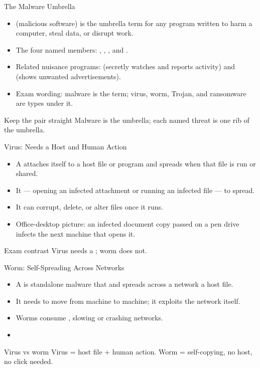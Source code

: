 \documentclass[aspectratio=169]{beamer}
\begin{document}
\begin{frame}{The Malware Umbrella}
  \begin{itemize}
    \item {} (malicious software) is the umbrella term for any
      program written to harm a computer, steal data, or disrupt work.
    \item The four named members: , ,
      , and .
    \item Related nuisance programs:  (secretly watches and
      reports activity) and  (shows unwanted advertisements).
    \item Exam wording: malware is the  term; virus, worm,
      Trojan, and ransomware are  types under it.
  \end{itemize}
  \begin{block}{Keep the pair straight}
    Malware is the umbrella; each named threat is one rib of the umbrella.
  \end{block}
\end{frame}

\begin{frame}{Virus: Needs a Host and Human Action}
  \begin{itemize}
    \item A  attaches itself to a host file or program and
      spreads when that file is run or shared.
    \item It  --- opening an infected attachment or
      running an infected file --- to spread.
    \item It can corrupt, delete, or alter files once it runs.
    \item Office-desktop picture: an infected document copy passed on a
      pen drive infects the next machine that opens it.
  \end{itemize}
  \begin{alertblock}{Exam contrast}
    Virus needs a ; worm does not.
  \end{alertblock}
\end{frame}

\begin{frame}{Worm: Self-Spreading Across Networks}
  \begin{itemize}
    \item A  is standalone malware that  and
      spreads across a network  a host file.
    \item It needs  to move from machine to machine;
      it exploits the network itself.
    \item Worms consume , slowing or
      crashing networks.
    \item {}
  \end{itemize}
  \begin{block}{Virus vs worm}
    Virus = host file + human action. Worm = self-copying, no host, no
    click needed.
  \end{block}
\end{frame}
\end{document}
